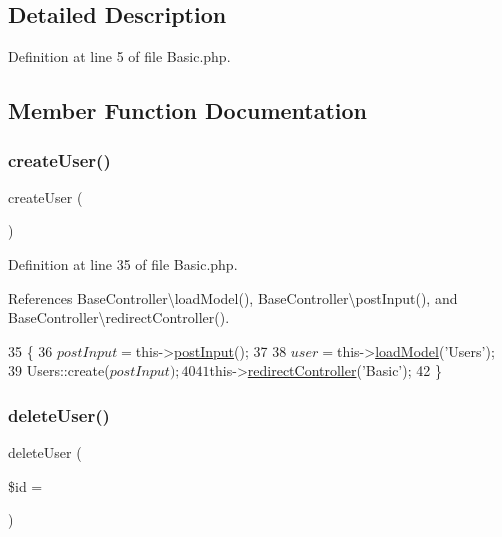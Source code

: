 \subsection{Detailed Description}


Definition at line 5 of file Basic.\+php.



\subsection{Member Function Documentation}
\hypertarget{class_basic_a967982ee98f05287bbdba812f6016947}{}\label{class_basic_a967982ee98f05287bbdba812f6016947} 
\subsubsection{\texorpdfstring{create\+User()}{createUser()}}
{\footnotesize\ttfamily create\+User (\begin{DoxyParamCaption}{ }\end{DoxyParamCaption})}



Definition at line 35 of file Basic.\+php.



References Base\+Controller\textbackslash{}load\+Model(), Base\+Controller\textbackslash{}post\+Input(), and Base\+Controller\textbackslash{}redirect\+Controller().


\begin{DoxyCode}
35                                  \{
36         $postInput = $this->\hyperlink{class_base_controller_a170629218b28c1759a89c4978b9323b3}{postInput}();
37 
38         $user = $this->\hyperlink{class_base_controller_a5fa8890bd3a9d20f5c0cc2377dc49eb1}{loadModel}(\textcolor{stringliteral}{'Users'});
39         Users::create($postInput);
40 
41         $this->\hyperlink{class_base_controller_a85ddb683efc64655be063b697f631beb}{redirectController}(\textcolor{stringliteral}{'Basic'});
42     \}
\end{DoxyCode}
\hypertarget{class_basic_a934aeeec370d904f3a58bde4d514259d}{}\label{class_basic_a934aeeec370d904f3a58bde4d514259d} 
\subsubsection{\texorpdfstring{delete\+User()}{deleteUser()}}
{\footnotesize\ttfamily delete\+User (\begin{DoxyParamCaption}\item[{}]{\$id = {\ttfamily \textquotesingle{}\textquotesingle{}} }\end{DoxyParamCaption})}



